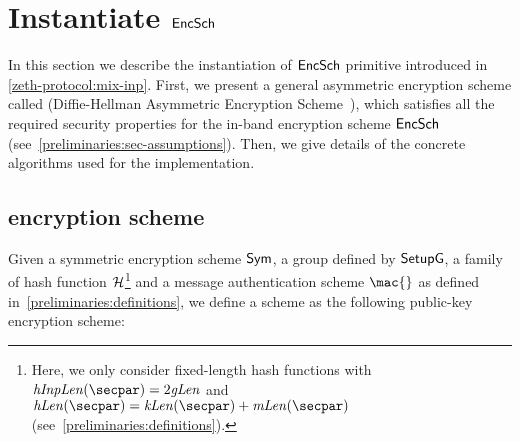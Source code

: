 
\section{Instantiate $\mathsf{EncSch}$}\label{instantiation:enc}

In this section we describe the instantiation of $\mathsf{EncSch}$ primitive introduced in \cref{zeth-protocol:mix-inp}. First, we present a general asymmetric encryption scheme called \dhaes{} (Diffie-Hellman Asymmetric Encryption Scheme~\cite{abdalla1999dhaes}), which satisfies all the required security properties for the in-band encryption scheme $\mathsf{EncSch}$ (see~\cref{preliminaries:sec-assumptions}). Then, we give details of the concrete algorithms used for the implementation.

\subsection{\dhaes{} encryption scheme}\label{instantiation:enc:dhaes}

Given a symmetric encryption scheme $\mathsf{Sym}{}$, a group defined by $\mathsf{SetupG}{}$, a family of hash function $\mathcal{H}{}$\footnote{Here, we only consider fixed-length hash functions with $\hashInpLen(\secpar) = 2\groupLen$ and $\hashLen(\secpar) = \symKeyLen(\secpar) + \macKeyLen(\secpar)$ (see~\cref{preliminaries:definitions}).} and a message authentication scheme $\mac{}$ as defined in~\cref{preliminaries:definitions}, we define a \dhaes{} scheme as the following public-key encryption scheme:

